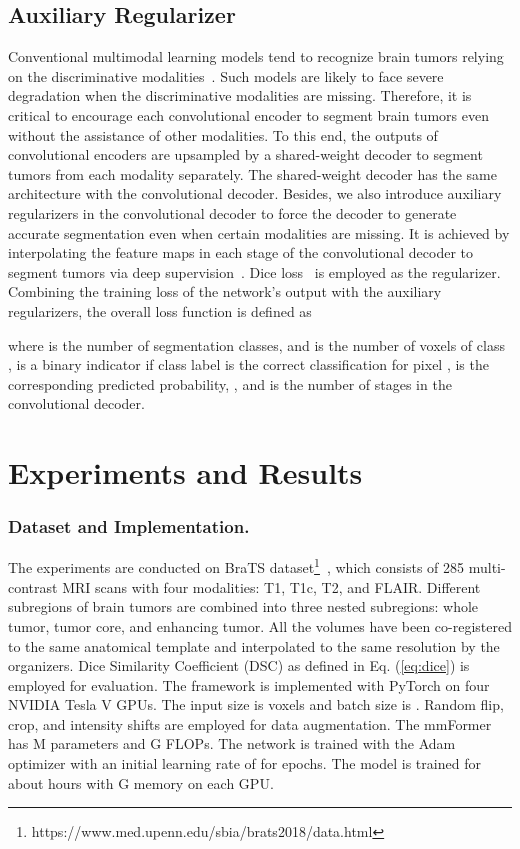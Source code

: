\documentclass[runningheads]{llncs}
\begin{document}
\subsection{Auxiliary Regularizer}
Conventional multimodal learning models tend to recognize brain tumors relying on the discriminative modalities~\cite{chen2019robust,ding2021rfnet}. Such models are likely to face severe degradation when the discriminative modalities are missing. Therefore, it is critical to encourage each convolutional encoder to segment brain tumors even without the assistance of other modalities. To this end, the outputs of convolutional encoders are upsampled by a shared-weight decoder to segment tumors from each modality separately. The shared-weight decoder has the same architecture with the convolutional decoder. 
Besides, we also introduce auxiliary regularizers in the convolutional decoder to force the decoder to generate accurate segmentation even when certain modalities are missing. It is achieved by interpolating the feature maps in each stage of the convolutional decoder to segment tumors via deep supervision~\cite{dou20173d}. 
Dice loss~\cite{milletari2016v} is employed as the regularizer. Combining the training loss of the network's output with the auxiliary regularizers, the overall loss function is defined as


where  is the number of segmentation classes, and  is the number of voxels of class ,  is a binary indicator if class label  is the correct classification for pixel ,  is the corresponding predicted probability, , and  is the number of stages in the convolutional decoder.

\section{Experiments and Results}
\label{sec:exp}
\subsubsection{Dataset and Implementation.} The experiments are conducted on BraTS  dataset\footnote{https://www.med.upenn.edu/sbia/brats2018/data.html}~\cite{menze2014multimodal}, which consists of 285 multi-contrast MRI scans with four modalities: T1, T1c, T2, and FLAIR. 
Different subregions of brain tumors are combined into three nested subregions: whole tumor, tumor core, and enhancing tumor. All the volumes have been co-registered to the same anatomical template and interpolated to the same resolution by the organizers. Dice Similarity Coefficient (DSC) as defined in Eq. (\ref{eq:dice}) is employed for evaluation.
The framework is implemented with PyTorch  on four NVIDIA Tesla V GPUs. The input size is  voxels and batch size is . Random flip, crop, and intensity shifts are employed for data augmentation. The mmFormer has M parameters and G FLOPs. The network is trained with the Adam optimizer with an initial learning rate of  for  epochs. The model is trained for about  hours with G memory on each GPU. 
\end{document}
